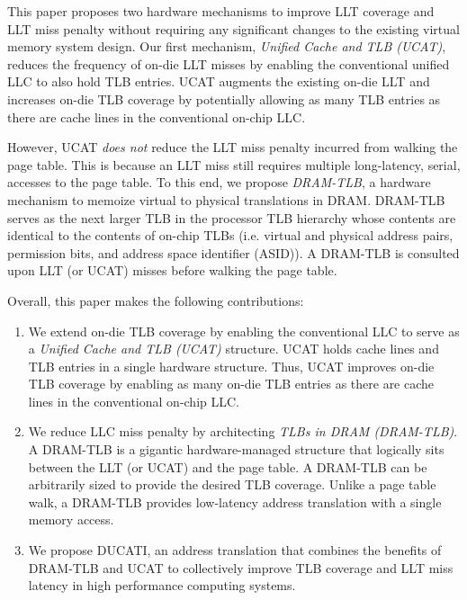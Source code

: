 This paper proposes two hardware mechanisms to improve LLT coverage
and LLT miss penalty without requiring any significant changes to the
existing virtual memory system design. Our first mechanism, {\em
Unified Cache and TLB (UCAT)}, reduces the frequency of on-die LLT
misses by enabling the conventional unified LLC to also hold TLB
entries. UCAT augments the existing on-die LLT and increases on-die
TLB coverage by potentially allowing as many TLB entries as there are
cache lines in the conventional on-chip LLC.


However, UCAT {\em does not} reduce the LLT miss penalty
incurred from walking the page table. This is because an
LLT miss still requires multiple long-latency, serial, accesses to the page table. To this end, we propose {\em
DRAM-TLB}, a hardware mechanism to memoize virtual to physical
translations in DRAM. DRAM-TLB serves as the next larger TLB in the
processor TLB hierarchy whose contents are identical to the contents
of on-chip TLBs (i.e. virtual and physical address pairs, permission
bits, and address space identifier (ASID)). A DRAM-TLB is consulted
upon LLT (or UCAT) misses before walking the page table.


Overall, this paper makes the following contributions:

\begin{enumerate}

  \item{We extend on-die TLB coverage by enabling the conventional LLC
    to serve as a {\em Unified Cache and TLB (UCAT)} structure. UCAT
    holds cache lines and TLB entries in a single hardware structure.
    Thus, UCAT improves on-die TLB coverage by enabling as many on-die
    TLB entries as there are cache lines in the conventional on-chip
    LLC.}

  \item{We reduce LLC miss penalty by architecting {\em TLBs in DRAM
    (DRAM-TLB)}. A DRAM-TLB is a gigantic hardware-managed structure
    that logically sits between the LLT (or UCAT) and the page table.
    A DRAM-TLB can be arbitrarily sized to provide the desired TLB
    coverage. Unlike a page table walk, a DRAM-TLB provides
    low-latency address translation with a single memory access. }


  \item{We propose DUCATI, an address translation that combines the
  benefits of DRAM-TLB and UCAT to collectively improve TLB coverage
  and LLT miss latency in high performance computing systems.}

\end{enumerate}

